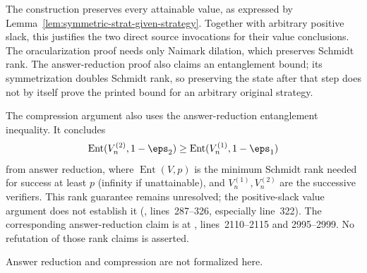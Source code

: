 \begin{remark}
	The construction preserves every attainable value, as expressed by
	Lemma~\ref{lem:symmetric-strat-given-strategy}. Together with arbitrary
	positive slack, this justifies the two direct source invocations for their
	value conclusions. The oracularization proof needs only Naimark dilation,
	which preserves Schmidt rank. The answer-reduction proof also claims an
	entanglement bound; its symmetrization doubles Schmidt rank, so preserving
	the state after that step does not by itself prove the printed bound for an
	arbitrary original strategy.

	The compression argument also uses the answer-reduction entanglement
	inequality. It concludes
	\[
		\operatorname{Ent}(V_n^{(2)},1-\eps_2)
		\geq \operatorname{Ent}(V_n^{(1)},1-\eps_1)
	\]
	from answer reduction, where $\operatorname{Ent}(V,p)$ is the minimum
	Schmidt rank needed for success at least $p$ (infinity if unattainable), and
	$V_n^{(1)},V_n^{(2)}$ are the successive verifiers. This rank guarantee remains
	unresolved; the positive-slack value argument does not establish it
	(,
	lines~287--326, especially line~322). The corresponding answer-reduction
	claim is at ,
	lines~2110--2115 and 2995--2999. No refutation of those rank claims is asserted.

	Answer reduction and compression are not formalized here.
\end{remark}

